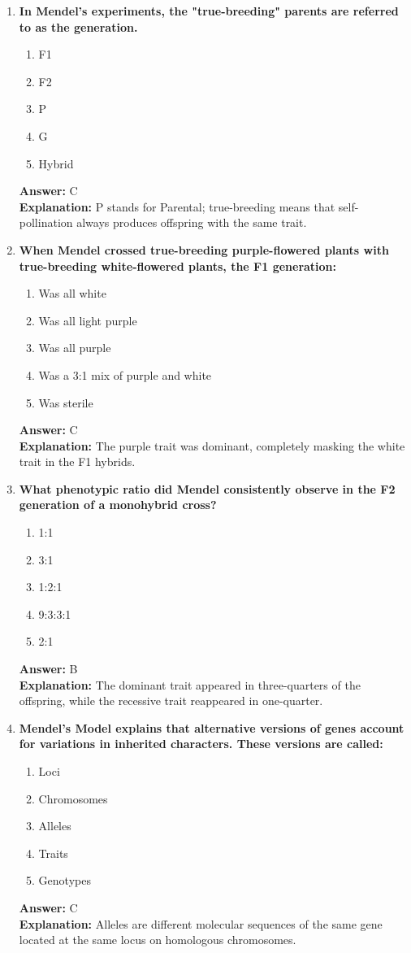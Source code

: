 \documentclass[11pt, a4paper]{article}
\begin{document}
\begin{enumerate}[leftmargin=*, label=\arabic*.]
\item \textbf{In Mendel's experiments, the "true-breeding" parents are referred to as the \underline{\hspace{1cm}} generation.}
\begin{enumerate}[label=\Alph*.]
\item F1
\item F2
\item P
\item G
\item Hybrid
\end{enumerate}
\textbf{Answer:} C \\
\textbf{Explanation:} P stands for Parental; true-breeding means that self-pollination always produces offspring with the same trait.

\item \textbf{When Mendel crossed true-breeding purple-flowered plants with true-breeding white-flowered plants, the F1 generation:}
\begin{enumerate}[label=\Alph*.]
\item Was all white
\item Was all light purple
\item Was all purple
\item Was a 3:1 mix of purple and white
\item Was sterile
\end{enumerate}
\textbf{Answer:} C \\
\textbf{Explanation:} The purple trait was dominant, completely masking the white trait in the F1 hybrids.

\item \textbf{What phenotypic ratio did Mendel consistently observe in the F2 generation of a monohybrid cross?}
\begin{enumerate}[label=\Alph*.]
\item 1:1
\item 3:1
\item 1:2:1
\item 9:3:3:1
\item 2:1
\end{enumerate}
\textbf{Answer:} B \\
\textbf{Explanation:} The dominant trait appeared in three-quarters of the offspring, while the recessive trait reappeared in one-quarter.

\item \textbf{Mendel’s Model explains that alternative versions of genes account for variations in inherited characters. These versions are called:}
\begin{enumerate}[label=\Alph*.]
\item Loci
\item Chromosomes
\item Alleles
\item Traits
\item Genotypes
\end{enumerate}
\textbf{Answer:} C \\
\textbf{Explanation:} Alleles are different molecular sequences of the same gene located at the same locus on homologous chromosomes.


\end{enumerate}
\end{document}
